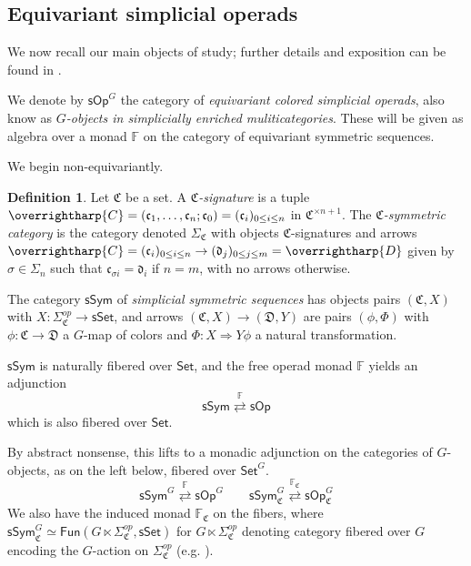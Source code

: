 \documentclass[a4paper,10pt
,draft
]{article}%
\numberwithin{equation}{section}
\numberwithin{figure}{section}
\theoremstyle{definition} %
\newtheorem{definition}[equation]{Definition}%
\newcommand{\vect}[1]{\text{\overrightharp{\ensuremath{#1}}}}
\newcommand{\Set}{\ensuremath{\mathsf{Set}}}
\newcommand{\sSet}{\ensuremath{\mathsf{sSet}}}%
\newcommand{\sOp}{\ensuremath{\mathsf{sOp}}}%
\newcommand{\sSym}{\ensuremath{\mathsf{sSym}}}%
\newcommand{\Fun}{\mathsf{Fun}}
\newcommand{\1}{\ensuremath{\mathbbm 1}}%
\begin{document}
\subsection{Equivariant simplicial operads}

We now recall our main objects of study; further details and exposition can be found in \cite[\S 2]{BP_HGOP}.

We denote by $\mathsf{sOp}^G$ the category of \textit{equivariant colored simplicial operads}, also know as \textit{$G$-objects in simplicially enriched muliticategories}.
These will be given as algebra over a monad $\mathbb F$ on the category of equivariant symmetric sequences.

We begin non-equivariantly.
\begin{definition}
      Let $\mathfrak C$ be a set. A \textit{$\mathfrak C$-signature} is a tuple
      $\vect C = (\mathfrak c_1, \dots, \mathfrak c_n; \mathfrak c_0) = (\mathfrak c_i)_{0 \leq i \leq n}$ in $\mathfrak C^{\times n+1}$.
      The \textit{$\mathfrak C$-symmetric category} is the category denoted $\Sigma_{\mathfrak C}$ with
      objects $\mathfrak C$-signatures and
      arrows $\vect C = (\mathfrak c_i)_{0 \leq i \leq n} \to (\mathfrak d_j)_{0 \leq j \leq m} = \vect D$
      given by $\sigma \in \Sigma_n$ such that $\mathfrak c_{\sigma i} = \mathfrak d_i$ if $n = m$, with no arrows otherwise.
\end{definition}

The category $\mathsf{sSym}$ of \textit{simplicial symmetric sequences} has
objects pairs $(\mathfrak C, X)$ with $X \colon \Sigma_{\mathfrak C}^{op} \to \sSet$,
and arrows $(\mathfrak C, X) \to (\mathfrak D, Y)$ are pairs $(\phi, \Phi)$ with
$\phi \colon \mathfrak C \to \mathfrak D$ a $G$-map of colors and
$\Phi \colon X \Rightarrow Y \phi$ a natural transformation.

$\sSym$ is naturally fibered over $\Set$,
and the free operad monad $\mathbb F$ yields an adjunction
\[
      \sSym \overset{\mathbb F}{\rightleftarrows} \sOp
\]
which is also fibered over $\Set$.

By abstract nonsense, this lifts to a monadic adjunction on the categories of $G$-objects, as on the left below, fibered over $\Set^G$.
\[
      \sSym^G \overset{\mathbb F}{\rightleftarrows} \sOp^G
      \qquad
      \sSym^G_{\mathfrak C} \overset{\mathbb F_{\mathfrak C}}{\rightleftarrows} \sOp^G_{\mathfrak C}
\]
We also have the induced monad $\mathbb F_{\mathfrak C}$ on the fibers,
where $\sSym^G_{\mathfrak C} \simeq \Fun(G \ltimes \Sigma_{\mathfrak C}^{op}, \sSet)$ for
$G \ltimes \Sigma_{\mathfrak C}^{op}$ denoting category fibered over $G$ encoding the $G$-action on $\Sigma_{\mathfrak C}^{op}$ (e.g. \cite[Example 2.13]{BP_HGOP}).
\end{document}

